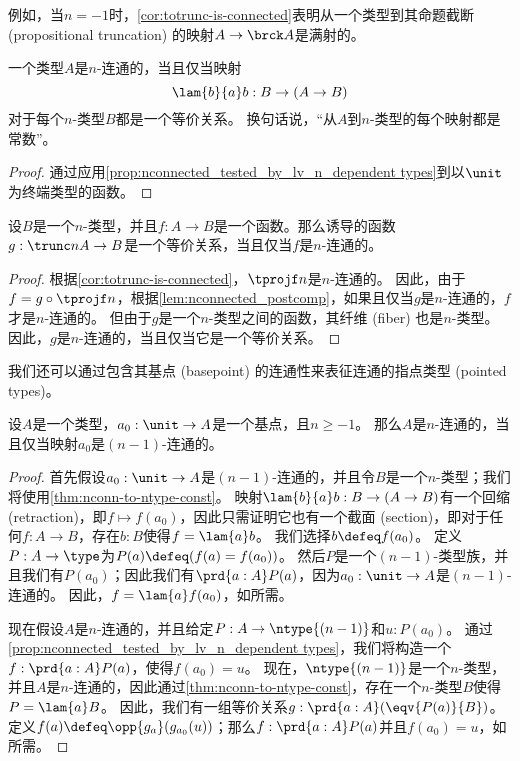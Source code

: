 例如，当$n=-1$时，\cref{cor:totrunc-is-connected}表明从一个类型到其命题截断 (propositional truncation) 的映射$A\to \brck A$是满射的。

\begin{cor}\label{thm:nconn-to-ntype-const}\label{connectedtotruncated}
一个类型$A$是$n$-连通的，当且仅当映射
\begin{equation*}
    \lam{b}{a} b: B \to (A\to B)
\end{equation*}
对于每个$n$-类型$B$都是一个等价关系。
换句话说，“从$A$到$n$-类型的每个映射都是常数”。
\end{cor}
\begin{proof}
    通过应用\cref{prop:nconnected_tested_by_lv_n_dependent types}到以$\unit$为终端类型的函数。
\end{proof}

\begin{lem}\label{lem:nconnected_to_leveln_to_equiv}
设$B$是一个$n$-类型，并且$f:A\to B$是一个函数。那么诱导的函数$g:\trunc n A\to B$是一个等价关系，当且仅当$f$是$n$-连通的。
\end{lem}

\begin{proof}
    根据\cref{cor:totrunc-is-connected}，$\tprojf n$是$n$-连通的。
    因此，由于$f = g\circ \tprojf n$，根据\cref{lem:nconnected_postcomp}，如果且仅当$g$是$n$-连通的，$f$才是$n$-连通的。
    但由于$g$是一个$n$-类型之间的函数，其纤维 (fiber) 也是$n$-类型。
    因此，$g$是$n$-连通的，当且仅当它是一个等价关系。
\end{proof}

我们还可以通过包含其基点 (basepoint) 的连通性来表征连通的指点类型 (pointed types)。

\begin{lem}\label{thm:connected-pointed}
%
设$A$是一个类型，$a_0:\unit\to A$是一个基点，且$n\ge -1$。
那么$A$是$n$-连通的，当且仅当映射$a_0$是$(n-1)$-连通的。
\end{lem}
\begin{proof}
    首先假设$a_0:\unit\to A$是$(n-1)$-连通的，并且令$B$是一个$n$-类型；我们将使用\cref{thm:nconn-to-ntype-const}。
    映射$\lam{b}{a} b: B \to (A\to B)$有一个回缩 (retraction)，即$f\mapsto f(a_0)$，因此只需证明它也有一个截面 (section)，即对于任何$f:A\to B$，存在$b:B$使得$f = \lam{a}b$。
    我们选择$b\defeq f(a_0)$。
    定义$P:A\to\type$为$P(a) \defeq (f(a)=f(a_0))$。
    然后$P$是一个$(n-1)$-类型族，并且我们有$P(a_0)$；因此我们有$\prd{a:A} P(a)$，因为$a_0:\unit\to A$是$(n-1)$-连通的。
    因此，$f = \lam{a} f(a_0)$，如所需。

    现在假设$A$是$n$-连通的，并且给定$P:A\to\ntype{(n-1)}$和$u:P(a_0)$。
    通过\cref{prop:nconnected_tested_by_lv_n_dependent types}，我们将构造一个$f:\prd{a:A} P(a)$，使得$f(a_0)=u$。
    现在，$\ntype{(n-1)}$是一个$n$-类型，并且$A$是$n$-连通的，因此通过\cref{thm:nconn-to-ntype-const}，存在一个$n$-类型$B$使得$P = \lam{a} B$。
    因此，我们有一组等价关系$g:\prd{a:A} (\eqv{P(a)}{B})$。
    定义$f(a) \defeq \opp{g_a}(g_{a_0}(u))$；那么$f:\prd{a:A} P(a)$并且$f(a_0) = u$，如所需。
\end{proof}

